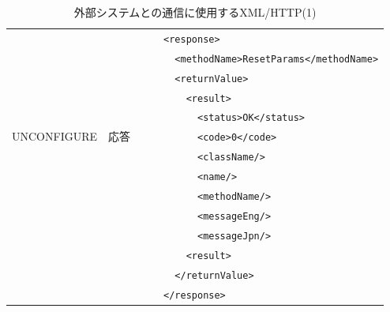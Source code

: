 \documentclass[a4j,10pt,dvips,onecolumn,oneside,final]{jarticle}%
\begin{document}
\begin{table}[htbp]
\begin{center}
{\begin{tabular}{|c|c|c|l|l|}
                  &           &      &                                            & \verb|<response>|\\ 
                  &           &      &                                            & \verb|  <methodName>ResetParams</methodName>|\\ 
                  &           &      &                                            & \verb|  <returnValue>|\\ 
                  &           &      &                                            & \verb|    <result>|\\ 
                  &           &      &                                            & \verb|      <status>OK</status>|\\ 
    UNCONFIGURE   & 応答      &      &                                            & \verb|      <code>0</code>|\\ 
                  &           &      &                                            & \verb|      <className/>|\\ 
                  &           &      &                                            & \verb|      <name/>|\\ 
                  &           &      &                                            & \verb|      <methodName/>|\\ 
                  &           &      &                                            & \verb|      <messageEng/>|\\ 
                  &           &      &                                            & \verb|      <messageJpn/>|\\ 
                  &           &      &                                            & \verb|    <result>|\\
                  &           &      &                                            & \verb|  </returnValue>|\\ 
                  &           &      &                                            & \verb|</response>|\\ \hline
    \end{tabular}
    \caption{外部システムとの通信に使用するXML/HTTP(1)}\label{http1.tab}
}
\end{center}
\end{table}
\end{document}
